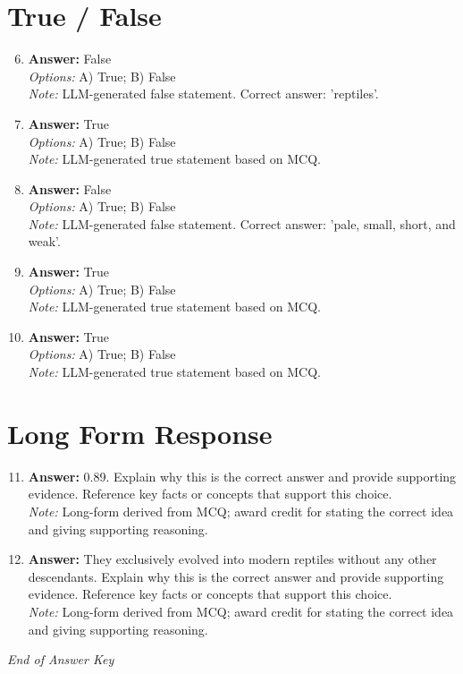 \documentclass[12pt]{article}
\begin{document}
\section*{True / False}
\begin{enumerate}[label=\arabic*.]
\setcounter{enumi}{5}
\item \textbf{Answer:} False
\\ \textit{Options:} A) True; B) False
\\ \textit{Note:} LLM-generated false statement. Correct answer: 'reptiles'.
\item \textbf{Answer:} True
\\ \textit{Options:} A) True; B) False
\\ \textit{Note:} LLM-generated true statement based on MCQ.
\item \textbf{Answer:} False
\\ \textit{Options:} A) True; B) False
\\ \textit{Note:} LLM-generated false statement. Correct answer: 'pale, small, short, and weak'.
\item \textbf{Answer:} True
\\ \textit{Options:} A) True; B) False
\\ \textit{Note:} LLM-generated true statement based on MCQ.
\item \textbf{Answer:} True
\\ \textit{Options:} A) True; B) False
\\ \textit{Note:} LLM-generated true statement based on MCQ.
\end{enumerate}

\section*{Long Form Response}
\begin{enumerate}[label=\arabic*.]
\setcounter{enumi}{10}
\item \textbf{Answer:} 0.89. Explain why this is the correct answer and provide supporting evidence. Reference key facts or concepts that support this choice.
\\ \textit{Note:} Long-form derived from MCQ; award credit for stating the correct idea and giving supporting reasoning.
\item \textbf{Answer:} They exclusively evolved into modern reptiles without any other descendants. Explain why this is the correct answer and provide supporting evidence. Reference key facts or concepts that support this choice.
\\ \textit{Note:} Long-form derived from MCQ; award credit for stating the correct idea and giving supporting reasoning.
\end{enumerate}

\vfill
\noindent\textit{End of Answer Key}
\end{document}
